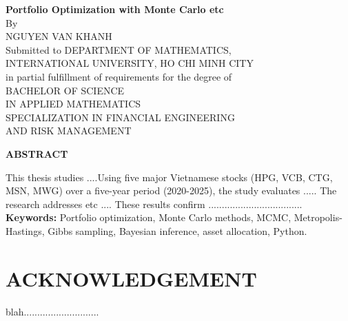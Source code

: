 \documentclass[12pt,a4paper,oneside]{book}
\theoremstyle{definition}
\begin{document}
		
	\newpage
	\thispagestyle{plain}
	\begin{center}
		\large\textbf{Portfolio Optimization with Monte Carlo etc} \\
		\normalsize{By}\\
		\large{NGUYEN VAN KHANH}\\
		\vskip10mm
		\normalsize{Submitted to DEPARTMENT OF MATHEMATICS,\\INTERNATIONAL UNIVERSITY, HO CHI MINH CITY\\ in partial fulfillment of requirements for the degree of\\
			BACHELOR OF SCIENCE \\ 
			IN APPLIED MATHEMATICS \\
			SPECIALIZATION IN FINANCIAL ENGINEERING  \\ 
			AND RISK MANAGEMENT}\\
		\vspace*{0.5cm}
		
		
	\large\textbf{ABSTRACT}\\
	\end{center}
	\vskip2mm
This thesis studies ....Using five major Vietnamese stocks (HPG, VCB, CTG, MSN, MWG) over a five-year period (2020-2025), the study evaluates ..... The research addresses etc .... These results confirm ...................................
\vskip10mm
\textbf{Keywords:} Portfolio optimization, Monte Carlo methods, MCMC, Metropolis-Hastings, Gibbs sampling, Bayesian inference, asset allocation, Python.
		
\newpage 
\clearpage
\chapter*{ACKNOWLEDGEMENT}

	
blah............................

	\newpage 
	\clearpage	
	
	\mainmatter
	\tableofcontents
	\newpage 
	\clearpage

    \mainmatter
\listoffigures
\newpage 
\clearpage


\mainmatter
\listoftables
\newpage 
\clearpage

    
\end{document}
